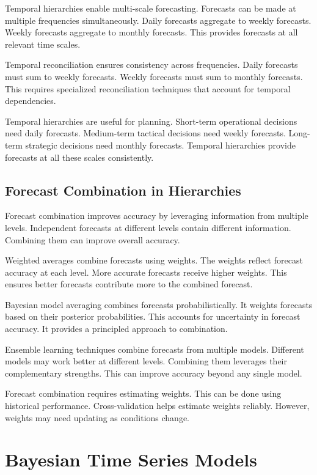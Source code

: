 Temporal hierarchies enable multi-scale forecasting. Forecasts can be made at multiple frequencies simultaneously. Daily forecasts aggregate to weekly forecasts. Weekly forecasts aggregate to monthly forecasts. This provides forecasts at all relevant time scales.

Temporal reconciliation ensures consistency across frequencies. Daily forecasts must sum to weekly forecasts. Weekly forecasts must sum to monthly forecasts. This requires specialized reconciliation techniques that account for temporal dependencies.

Temporal hierarchies are useful for planning. Short-term operational decisions need daily forecasts. Medium-term tactical decisions need weekly forecasts. Long-term strategic decisions need monthly forecasts. Temporal hierarchies provide forecasts at all these scales consistently.

\subsection{Forecast Combination in Hierarchies}

Forecast combination improves accuracy by leveraging information from multiple levels. Independent forecasts at different levels contain different information. Combining them can improve overall accuracy.

Weighted averages combine forecasts using weights. The weights reflect forecast accuracy at each level. More accurate forecasts receive higher weights. This ensures better forecasts contribute more to the combined forecast.

Bayesian model averaging combines forecasts probabilistically. It weights forecasts based on their posterior probabilities. This accounts for uncertainty in forecast accuracy. It provides a principled approach to combination.

Ensemble learning techniques combine forecasts from multiple models. Different models may work better at different levels. Combining them leverages their complementary strengths. This can improve accuracy beyond any single model.

Forecast combination requires estimating weights. This can be done using historical performance. Cross-validation helps estimate weights reliably. However, weights may need updating as conditions change.

\section{Bayesian Time Series Models}

